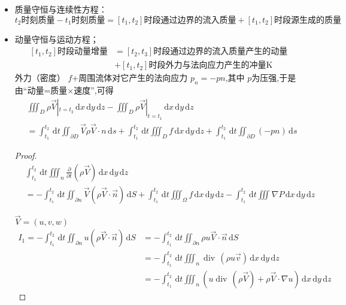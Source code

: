 \documentclass[../../PDE.tex]{subfiles}
\begin{document}
\begin{itemize}
    \item 质量守恒与连续性方程： \[
    t_2\text{时刻质量}- t_1\text{时刻质量} =  \left[ t_1,t_2 \right]\text{时段通过边界的流入质量} + \left[ t_1,t_2 \right]\text{时段源生成的质量}  
    \]
    \item 动量守恒与运动方程；
    \[
   \begin{aligned}
    \left[ t_1,t_2 \right] \text{时段动量增量} &=  \left[ t_2,t_3 \right]\text{时段通过边界的流入质量产生的动量}  \\ 
     & +  \left[ t_1,t_2 \right]\text{时段外力与法向应力产生的冲量K} 
   \end{aligned}
    \]外力（密度） \(  f  \)+周围流体对它产生的法向应力  \(  p_{n} = -pn  \),其中 \(  p  \)为压强,于是由“动量=质量\(  \times   \)速度”,可得 \[
    \begin{aligned}
       &  \iiint_{D} \rho \vec{V} |_{t= t_2} \,\mathrm{d} x\,\mathrm{d} y\,\mathrm{d} z- \iiint_{D}\rho \vec{V} |_{t=t_1}\,\mathrm{d} x\,\mathrm{d} y\,\mathrm{d} z\\ 
         & =   \int_{t_1}^{t_2}\,\mathrm{d} t  \iint_{\partial D}\vec{V} \rho \vec{V} \cdot n\,\mathrm{d} s+ \int_{t_1}^{t_2}\,\mathrm{d} t \iiint_{D}f \,\mathrm{d} x\,\mathrm{d} y\,\mathrm{d} z+ \int_{t_1}^{t_2}\,\mathrm{d} t \iint_{\partial D}\left( -pn \right)\,\mathrm{d} s 
    \end{aligned}
    \]    

    \begin{proof}
        \[
        \begin{aligned}
           & \int_{t_1}^{t_2}\,\mathrm{d} t \iiint _{n} \frac{\partial }{\partial t} \left( \rho \vec{V}  \right)\,\mathrm{d} x\,\mathrm{d} y\,\mathrm{d} z\\ 
            & =   -\int_{t_1}^{t_2}\,\mathrm{d} t \iint_{\partial n} \vec{V} \left( \rho \vec{V} \cdot \vec{n}  \right) \,\mathrm{d} S+ \int_{t_1}^{t_2}\,\mathrm{d} t \iiint_{ \Omega }f\,\mathrm{d} x\,\mathrm{d} y\,\mathrm{d} z-\int_{t_1}^{t_2}\,\mathrm{d} t \iiint_{}  \nabla P\,\mathrm{d} x\,\mathrm{d} y\,\mathrm{d} z
        \end{aligned} 
        \]

        \(  \vec{V} = \left( u,v,w \right)   \)  \[
    \begin{aligned}
       I_1=  -\int_{t_1}^{t_2}\,\mathrm{d} t \iint_{\partial n} u\left( \rho \vec{V} \cdot \vec{n}  \right)\,\mathrm{d} S & =  
        -\int_{t_1}^{t_2}\,\mathrm{d} t \iint_{\partial n} \rho u \vec{V}  \cdot \vec{n}  \,\mathrm{d} S\\ 
         & =  -\int_{t_1}^{t_2}\,\mathrm{d} t \iiint_{n} \operatorname{div}\,\left( \rho  u \vec{v}  \right)\,\mathrm{d} x\,\mathrm{d} y\,\mathrm{d} z\\ 
          & =  -\int_{t_1}^{t_2}\,\mathrm{d} t \iiint_{n}\left(  u  \operatorname{div}\,\left( \rho  \vec{V}  \right)+  \rho \vec{V} \cdot  \nabla u \right)\,\mathrm{d} x\,\mathrm{d} y\,\mathrm{d} z   
    \end{aligned}
        \]
    

\end{proof}
\end{itemize}
\end{document}
